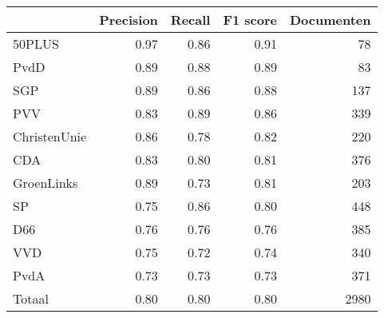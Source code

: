 \begin{tabular}{lrrrr}
\toprule
{} &  Precision &  Recall &  F1 score &  Documenten \\
\midrule
50PLUS       &       0.97 &    0.86 &      0.91 &          78 \\
PvdD         &       0.89 &    0.88 &      0.89 &          83 \\
SGP          &       0.89 &    0.86 &      0.88 &         137 \\
PVV          &       0.83 &    0.89 &      0.86 &         339 \\
ChristenUnie &       0.86 &    0.78 &      0.82 &         220 \\
CDA          &       0.83 &    0.80 &      0.81 &         376 \\
GroenLinks   &       0.89 &    0.73 &      0.81 &         203 \\
SP           &       0.75 &    0.86 &      0.80 &         448 \\
D66          &       0.76 &    0.76 &      0.76 &         385 \\
VVD          &       0.75 &    0.72 &      0.74 &         340 \\
PvdA         &       0.73 &    0.73 &      0.73 &         371 \\
\midrule
Totaal       &       0.80 &    0.80 &      0.80 &        2980 \\
\bottomrule
\end{tabular}
